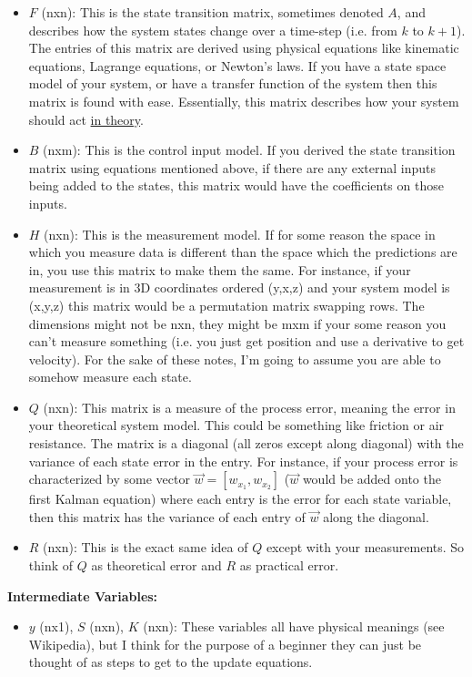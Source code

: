 \documentclass{article} %
\begin{document}
\begin{itemize}
\item $F$ (nxn): This is the state transition matrix, sometimes denoted $A$, and describes how the system states change over a time-step (i.e. from $k$ to $k+1$). The entries of this matrix are derived using physical equations like kinematic equations, Lagrange equations, or Newton's laws. If you have a state space model of your system, or have a transfer function of the system then this matrix is found with ease. Essentially, this matrix describes how your system should act \underline{in theory}.
\item $B$ (nxm): This is the control input model. If you derived the state transition matrix using equations mentioned above, if there are any external inputs being added to the states, this matrix would have the coefficients on those inputs.
\item $H$ (nxn): This is the measurement model. If for some reason the space in which you measure data is different than the space which the predictions are in, you use this matrix to make them the same. For instance, if your measurement is in 3D coordinates ordered (y,x,z) and your system model is (x,y,z) this matrix would be a permutation matrix swapping rows. The dimensions might not be nxn, they might be mxm if your some reason you can't measure something (i.e. you just get position and use a derivative to get velocity). For the sake of these notes, I'm going to assume you are able to somehow measure each state.
\item $Q$ (nxn): This matrix is a measure of the process error, meaning the error in your theoretical system model. This could be something like friction or air resistance. The matrix is a diagonal (all zeros except along diagonal) with the variance of each state error in the entry. For instance, if your process error is characterized by some vector $\vec{w} = [w_{x_1}, w_{x_2}]$ ($\vec{w}$ would be added onto the first Kalman equation) where each entry is the error for each state variable, then this matrix has the variance of each entry of $\vec{w}$ along the diagonal.
\item $R$ (nxn): This is the exact same idea of $Q$ except with your measurements. So think of $Q$ as theoretical error and $R$ as practical error.
\end{itemize}
\textbf{Intermediate Variables: }
\begin{itemize}
\item $y$ (nx1), $S$ (nxn), $K$ (nxn): These variables all have physical meanings (see Wikipedia), but I think for the purpose of a beginner they can just be thought of as steps to get to the update equations.
\end{itemize}
\end{document}
